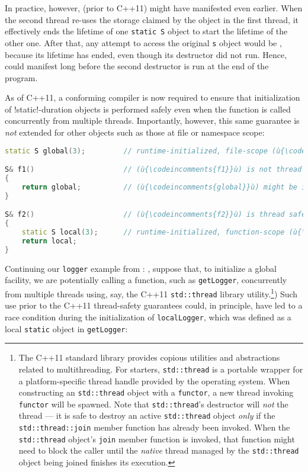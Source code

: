 In practice, however,  (prior to C++11) might
have manifested even earlier. When the second thread re-uses the storage
claimed by the object in the first thread, it effectively ends the
lifetime of one \lstinline!static!~\lstinline!S! object to start the lifetime
of the other one. After that, any attempt to access the original
\lstinline!s! object would be , because its
lifetime has ended, even though its destructor did not run. Hence,
 could manifest long before the second
destructor is run at the end of the program.

As of C++11, a conforming compiler is now required to ensure that
initialization of  !static!-duration
objects is performed safely even when the function is called
concurrently from multiple threads. Importantly, however, this same
guarantee is \emph{not} extended for other 
objects such as those at file or namespace scope:

\begin{lstlisting}[language=C++]
static S global(3);         // runtime-initialized, file-scope (ù{\codeincomments{static}}ù)

S& f1()                     // (ù{\codeincomments{f1}}ù) is not thread safe.
{
    return global;          // (ù{\codeincomments{global}}ù) might be in any state.
}

S& f2()                     // (ù{\codeincomments{f2}}ù) is thread safe.
{
    static S local(3);      // runtime-initialized, function-scope (ù{\codeincomments{static}}ù)
    return local;
}
\end{lstlisting}
    
\noindent Continuing our \lstinline!logger! example from {}:
{}, suppose that, to initialize a global
facility, we are potentially calling a function, such as
\lstinline!getLogger!, concurrently from multiple threads using, say, the
C++11 \lstinline!std::thread! library utility.{\cprotect\footnote{The C++11
standard library provides copious utilities and abstractions related
to multithreading. For starters, \lstinline!std::thread! is a portable
wrapper for a platform-specific thread handle provided by the
operating system. When constructing an \lstinline!std::thread! object
with a  \lstinline!functor!, a new thread
invoking \lstinline!functor! will be spawned. Note that
\lstinline!std::thread!'s destructor will \emph{not}  the
thread --- it is safe to destroy an active \lstinline!std::thread! object
\emph{only} if the \lstinline!std::thread::join! member function has
already been invoked. When the \lstinline!std::thread! object's
\lstinline!join! member function is invoked, that function might need to
block the caller until the \emph{native} thread managed by the
  \lstinline!std::thread! object being joined finishes its execution.}})
Such use prior to the C++11 thread-safety guarantees could, in
principle, have led to a race condition during the initialization of
\lstinline!localLogger!, which was defined as a local \lstinline!static!
object in \lstinline!getLogger!:


